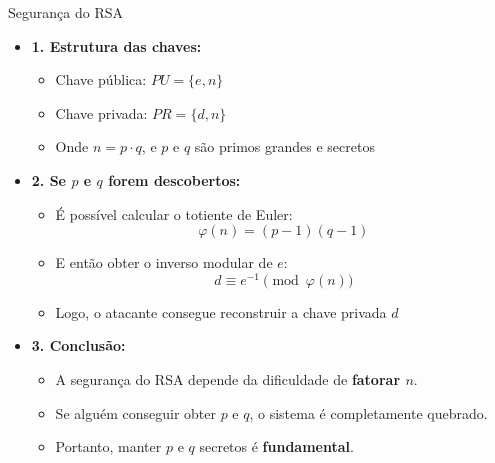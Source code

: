 \begin{frame}{Segurança do RSA}
  \begin{itemize}
    \item \textbf{1. Estrutura das chaves:}
          \begin{itemize}
            \item Chave pública: $PU = \{e, n\}$
            \item Chave privada: $PR = \{d, n\}$
            \item Onde $n = p \cdot q$, e $p$ e $q$ são primos grandes e secretos
          \end{itemize}

          \vspace{0.3cm}

    \item \textbf{2. Se $p$ e $q$ forem descobertos:}
          \begin{itemize}
            \item É possível calcular o totiente de Euler:
                  \[
                    \varphi(n) = (p - 1)(q - 1)
                  \]
            \item E então obter o inverso modular de $e$:
                  \[
                    d \equiv e^{-1} \pmod{\varphi(n)}
                  \]
            \item Logo, o atacante consegue reconstruir a chave privada $d$
          \end{itemize}

          \vspace{0.3cm}

    \item \textbf{3. Conclusão:}
          \begin{itemize}
            \item A segurança do RSA depende da dificuldade de \textbf{fatorar $n$}.
            \item Se alguém conseguir obter $p$ e $q$, o sistema é completamente quebrado.
            \item Portanto, manter $p$ e $q$ secretos é \textbf{fundamental}.
          \end{itemize}
  \end{itemize}
\end{frame}

